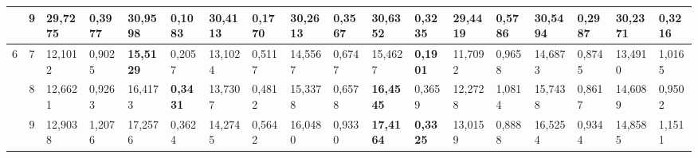 \documentclass[conference]{IEEEtran}
\begin{document}
\begin{table*}[]
\begin{tabular}{|cc|ll|ll|ll|ll|ll|ll|ll|ll|}
		\multicolumn{1}{|c|}{}                    & 9          & \multicolumn{1}{l|}{29,7275}           & 0,3977                            & \multicolumn{1}{l|}{\textbf{30,9598}}  & \textbf{0,1083}                   & \multicolumn{1}{l|}{30,4113}           & 0,1770                            & \multicolumn{1}{l|}{30,2613}           & 0,3567                            & \multicolumn{1}{l|}{30,6352}           & 0,3235                            & \multicolumn{1}{l|}{29,4419}           & 0,5786                            & \multicolumn{1}{l|}{30,5494}           & 0,2987                            & \multicolumn{1}{l|}{30,2371}           & 0,3216                            \\ \hline
		\multicolumn{1}{|c|}{\multirow{3}{*}{6}}  & 7          & \multicolumn{1}{l|}{12,1012}           & 0,9025                            & \multicolumn{1}{l|}{\textbf{15,5129}}  & 0,2057                            & \multicolumn{1}{l|}{13,1024}           & 0,5117                            & \multicolumn{1}{l|}{14,5567}           & 0,6747                            & \multicolumn{1}{l|}{15,4627}           & \textbf{0,1901}                   & \multicolumn{1}{l|}{11,7092}           & 0,9658                            & \multicolumn{1}{l|}{14,6873}           & 0,8745                            & \multicolumn{1}{l|}{13,4910}           & 1,0165                            \\ \cline{2-18} 
		\multicolumn{1}{|c|}{}                    & 8          & \multicolumn{1}{l|}{12,6621}           & 0,9263                            & \multicolumn{1}{l|}{16,4173}           & \textbf{0,3431}                   & \multicolumn{1}{l|}{13,7307}           & 0,4812                            & \multicolumn{1}{l|}{15,3378}           & 0,6578                            & \multicolumn{1}{l|}{\textbf{16,4545}}  & 0,3659                            & \multicolumn{1}{l|}{12,2728}           & 1,0814                            & \multicolumn{1}{l|}{15,7438}           & 0,8617                            & \multicolumn{1}{l|}{14,6089}           & 0,9502                            \\ \cline{2-18} 
		\multicolumn{1}{|c|}{}                    & 9          & \multicolumn{1}{l|}{12,9038}           & 1,2076                            & \multicolumn{1}{l|}{17,2576}           & 0,3624                            & \multicolumn{1}{l|}{14,2745}           & 0,5642                            & \multicolumn{1}{l|}{16,0480}           & 0,9330                            & \multicolumn{1}{l|}{\textbf{17,4164}}  & \textbf{0,3325}                   & \multicolumn{1}{l|}{13,0159}           & 0,8888                            & \multicolumn{1}{l|}{16,5254}           & 0,9344                            & \multicolumn{1}{l|}{14,8585}           & 1,1511                            \\ \hline

\end{tabular}
\end{table*}
\end{document}
